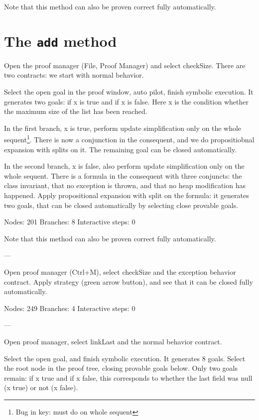 Note that this method can also be proven correct fully automatically.

\section{The \texttt{add} method}\label{sec:add}

Open the proof manager (File, Proof Manager) and select checkSize. There are two contracts: we start with normal behavior.

Select the open goal in the proof window, auto pilot, finish symbolic execution. It generates two goals: if x is true and if x is false. Here x is the condition whether the maximum size of the list has been reached.

In the first branch, x is true, perform update simplification only on the whole sequent\footnote{Bug in key: must do on whole sequent}. There is now a conjunction in the consequent, and we do propositiobnal expansion with splits on it. The remaining goal can be closed automatically.

In the second branch, x is false, also perform update simplification only on the whole sequent. There is a formula in the consequent with three conjuncts: the class invariant, that no exception is thrown, and that no heap modification has happened. Apply propositional expansion with split on the formula: it generates two goals, that can be closed automatically by selecting close provable goals.

Nodes: 201
Branches: 8
Interactive steps: 0

Note that this method can also be proven correct fully automatically.

---

Open proof manager (Ctrl+M), select checkSize and the exception behavior contract. Apply strategy (green arrow button), and see that it can be closed fully automatically.

Nodes: 249
Branches: 4
Interactive steps: 0

---

Open proof manager, select linkLast and the normal behavior contract.

Select the open goal, and finish symbolic execution. It generates 8 goals. Select the root node in the proof tree, closing provable goals below. Only two goals remain: if x true and if x false, this corresponds to whether the last field was null (x true) or not (x false).


